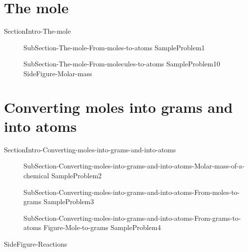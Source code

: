 \documentclass[main.tex]{subfiles}
\newcommand\chapterlabel{Ch-mole}\setcounter{figurenewcounter}{0}\setcounter{tablenewcounter}{0}\setcounter{formulanewcounter}{0}\chapterpicture{../{\chapterlabel}/figure1}\chapterpicturelabel{PngImg}
\begin{document}
\section{The mole}{SectionIntro-The-mole}
\sloppy \begin{description}
\item[] {SubSection-The-mole-From-moles-to-atoms}
\hspace{-3cm}{Figure-The-mole}
{SampleProblem1}
\item[] {SubSection-The-mole-From-molecules-to-atoms}
{SampleProblem10}
{SideFigure-Molar-mass}
\end{description}
	



\section{Converting moles into grams and into atoms}{SectionIntro-Converting-moles-into-grams-and-into-atoms}
\sloppy \begin{description}
\item[] {SubSection-Converting-moles-into-grams-and-into-atoms-Molar-mass-of-a-chemical}
{SampleProblem2}
 \hspace{0cm}{Figure-Mole-equivalency}

\item[] {SubSection-Converting-moles-into-grams-and-into-atoms-From-moles-to-grams}
{SampleProblem3}
\item[] {SubSection-Converting-moles-into-grams-and-into-atoms-From-grams-to-atoms}
{Figure-Mole-to-grams}
{SampleProblem4}
\end{description}




 {SideFigure-Reactions}
\end{document}

